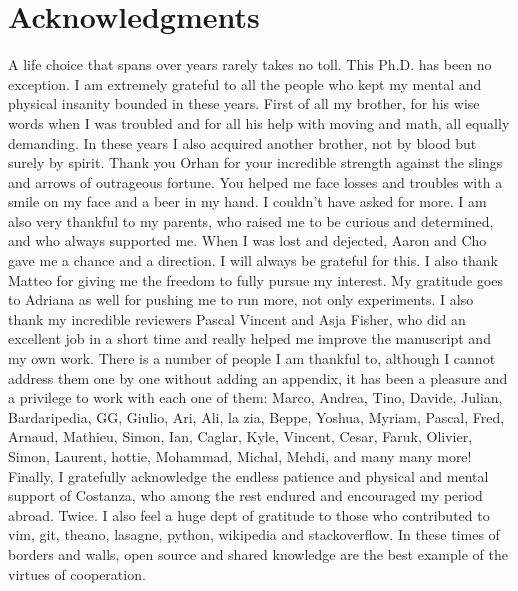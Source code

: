 \chapter*{Acknowledgments}

A life choice that spans over years rarely takes no toll. This Ph.D. has been
no exception. I am extremely grateful to all the people who kept my mental and
physical insanity bounded in these years. First of all my brother, for his wise
words when I was troubled and for all his help with moving and math, all
equally demanding. In these years I also acquired another brother, not by blood
but surely by spirit. Thank you Orhan for your incredible strength against the
slings and arrows of outrageous fortune. You helped me face losses and troubles
with a smile on my face and a beer in my hand. I couldn't have asked for more.
I am also very thankful to my parents, who raised me to be curious and
determined, and who always supported me. When I was lost and dejected, Aaron
and Cho gave me a chance and a direction. I will always be grateful for this. I
also thank Matteo for giving me the freedom to fully pursue my interest. My
gratitude goes to Adriana as well for pushing me to run more, not only
experiments. I also thank my incredible reviewers Pascal Vincent and Asja
Fisher, who did an excellent job in a short time and really helped me improve
the manuscript and my own work. There is a number of people I am thankful to,
although I cannot address them one by one without adding an appendix, it has
been a pleasure and a privilege to work with each one of them: Marco, Andrea,
Tino, Davide, Julian, Bardaripedia\textsuperscript{\textregistered}, GG,
Giulio, Ari, Ali, la zia, Beppe, Yoshua, Myriam, Pascal, Fred, Arnaud, Mathieu,
Simon, Ian, Caglar, Kyle, Vincent, Cesar, Faruk, Olivier, Simon, Laurent,
hottie, Mohammad, Michal, Mehdi, and many many more! Finally, I gratefully
acknowledge the endless patience and physical and mental support of Costanza,
who among the rest endured and encouraged my period abroad. Twice.  I also feel
a huge dept of gratitude to those who contributed to vim, git, theano, lasagne,
python, wikipedia and stackoverflow. In these times of borders and walls, open
source and shared knowledge are the best example of the virtues of cooperation.

